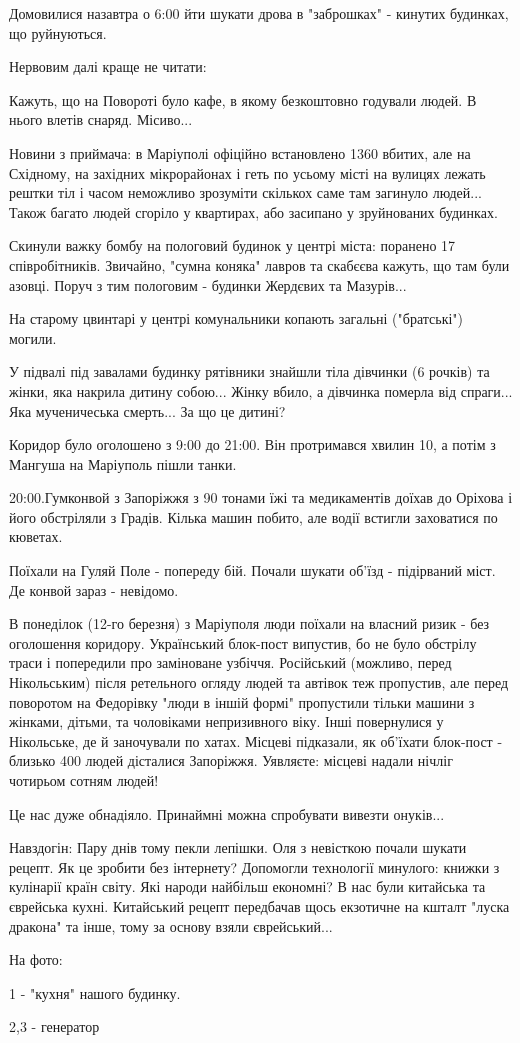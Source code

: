 Домовилися назавтра о 6:00 йти шукати дрова в "заброшках" - кинутих будинках,
що руйнуються. 

Нервовим далі краще не читати:

Кажуть, що на Повороті було кафе, в якому безкоштовно годували людей. В нього
влетів снаряд. Місиво...

Новини з приймача: в Маріуполі офіційно встановлено 1360 вбитих, але на
Східному, на західних мікрорайонах і геть по усьому місті на вулицях лежать
рештки тіл і часом неможливо зрозуміти скількох саме там загинуло людей...
Також багато людей сгоріло у квартирах, або засипано у зруйнованих будинках.

Скинули важку бомбу на пологовий будинок у центрі міста: поранено 17
співробітників. Звичайно, "сумна коняка" лавров та скабєєва кажуть, що там були
азовці.  Поруч з тим пологовим - будинки Жердєвих та Мазурів...

На старому цвинтарі у центрі комунальники копають загальні ("братські") могили.

У підвалі під завалами будинку рятівники знайшли тіла дівчинки (6 рочків) та
жінки, яка накрила дитину собою... Жінку вбило, а дівчинка померла від
спраги... Яка мученичеська смерть... За що це дитині?

Коридор було оголошено з 9:00 до 21:00. Він протримався хвилин 10, а потім з
Мангуша на Маріуполь пішли танки.  

20:00.Гумконвой з Запоріжжя з 90 тонами їжі та медикаментів  доїхав до Оріхова
і його обстріляли з Градів. Кілька машин побито, але водії встигли заховатися
по кюветах.

Поїхали на Гуляй Поле - попереду бій. Почали шукати об'їзд - підірваний міст.
Де конвой зараз - невідомо.

В понеділок (12-го березня) з Маріуполя люди поїхали на власний ризик - без
оголошення коридору. Український блок-пост випустив, бо не було обстрілу траси
і попередили про заміноване узбіччя. Російський (можливо, перед Нікольським)
після ретельного огляду людей та автівок теж пропустив, але перед поворотом на
Федорівку "люди в іншій формі" пропустили тільки машини з жінками, дітьми, та
чоловіками непризивного віку. Інші повернулися у Нікольське, де й заночували по
хатах. Місцеві підказали, як об'їхати блок-пост - близько 400 людей дісталися
Запоріжжя. Уявляєте: місцеві надали нічліг чотирьом сотням людей!  

Це нас дуже обнадіяло. Принаймні можна спробувати вивезти онуків...

Навздогін: Пару днів тому пекли лепішки. Оля з невісткою почали шукати рецепт.
Як це зробити без інтернету? Допомогли технології минулого: книжки з кулінарії
країн світу. Які народи найбільш економні? В нас були китайська та єврейська
кухні. Китайський рецепт передбачав щось екзотичне на кшталт "луска дракона" та
інше, тому за основу взяли єврейський...

На фото:

1 - "кухня" нашого будинку.

2,3 - генератор
